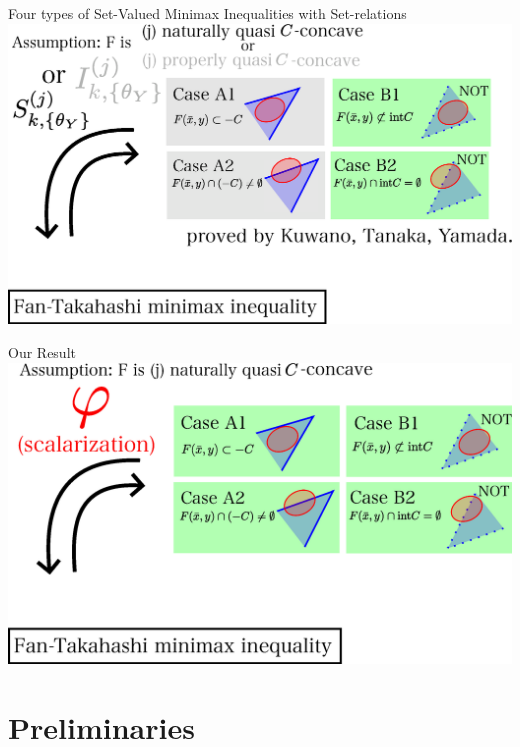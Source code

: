 \documentclass[aspectratio=169, dvipdfmx, 11pt]{beamer}
\begin{document}
\begin{frame}{Four types of Set-Valued Minimax Inequalities with Set-relations}
  \centering
  \includegraphics[keepaspectratio, scale=0.38]{figures/eps/kuwano_tanaka_yamada_results_naturally.eps}
\end{frame}

\begin{frame}{Our Result}
  \centering
  \includegraphics[keepaspectratio, scale=0.38]{figures/eps/iwamoto_tanaka_results.eps}
\end{frame}

\section{Preliminaries}
\end{document}
